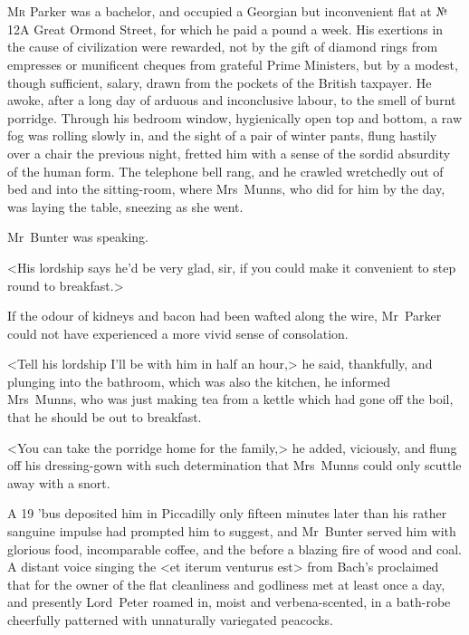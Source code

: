 \chapter[Chapter \thechapter]{}
\lettrine{M}{r} Parker was a bachelor, and occupied a Georgian but inconvenient flat at № 12A Great Ormond Street, for which he paid a pound a week. His exertions in the cause of civilization were rewarded, not by the gift of diamond rings from empresses or munificent cheques from grateful Prime Ministers, but by a modest, though sufficient, salary, drawn from the pockets of the British taxpayer. He awoke, after a long day of arduous and inconclusive labour, to the smell of burnt porridge. Through his bedroom window, hygienically open top and bottom, a raw fog was rolling slowly in, and the sight of a pair of winter pants, flung hastily over a chair the previous night, fretted him with a sense of the sordid absurdity of the human form. The telephone bell rang, and he crawled wretchedly out of bed and into the sitting-room, where Mrs~Munns, who did for him by the day, was laying the table, sneezing as she went.

Mr~Bunter was speaking.

<His lordship says he'd be very glad, sir, if you could make it convenient to step round to breakfast.>

If the odour of kidneys and bacon had been wafted along the wire, Mr~Parker could not have experienced a more vivid sense of consolation.

<Tell his lordship I'll be with him in half an hour,> he said, thankfully, and plunging into the bathroom, which was also the kitchen, he informed Mrs~Munns, who was just making tea from a kettle which had gone off the boil, that he should be out to breakfast.

<You can take the porridge home for the family,> he added, viciously, and flung off his dressing-gown with such determination that Mrs~Munns could only scuttle away with a snort.

A 19 'bus deposited him in Piccadilly only fifteen minutes later than his rather sanguine impulse had prompted him to suggest, and Mr~Bunter served him with glorious food, incomparable coffee, and the  before a blazing fire of wood and coal. A distant voice singing the <et iterum venturus est> from Bach's  proclaimed that for the owner of the flat cleanliness and godliness met at least once a day, and presently Lord~Peter roamed in, moist and verbena-scented, in a bath-robe cheerfully patterned with unnaturally variegated peacocks.

